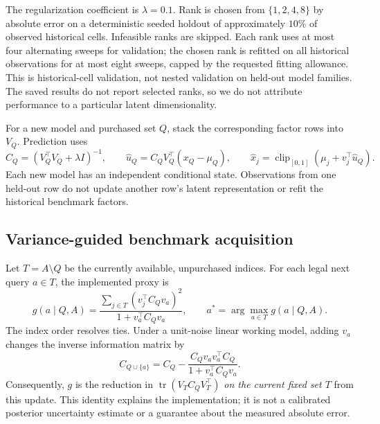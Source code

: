 \documentclass{article}
\begin{document}
The regularization coefficient is $\lambda=0.1$. Rank is chosen from $\{1,2,4,8\}$ by absolute error on a deterministic seeded holdout of approximately $10\%$ of observed historical cells. Infeasible ranks are skipped. Each rank uses at most four alternating sweeps for validation; the chosen rank is refitted on all historical observations for at most eight sweeps, capped by the requested fitting allowance. This is historical-cell validation, not nested validation on held-out model families. The saved results do not report selected ranks, so we do not attribute performance to a particular latent dimensionality.

For a new model and purchased set $Q$, stack the corresponding factor rows into $V_Q$. Prediction uses
\begin{equation}
 C_Q=(V_Q^\top V_Q+\lambda I)^{-1},\qquad
 \hat u_Q=C_QV_Q^\top(x_Q-\mu_Q),\qquad
 \hat x_j=\operatorname{clip}_{[0,1]}(\mu_j+v_j^\top\hat u_Q).
 \label{eq:predict}
\end{equation}
Each new model has an independent conditional state. Observations from one held-out row do not update another row's latent representation or refit the historical benchmark factors.

\subsection{Variance-guided benchmark acquisition}
Let $T=A\setminus Q$ be the currently available, unpurchased indices. For each legal next query $a\in T$, the implemented proxy is
\begin{equation}
 g(a\mid Q,A)=\frac{\sum_{j\in T}(v_j^\top C_Qv_a)^2}
                         {1+v_a^\top C_Qv_a},\qquad
 a^*=\arg\max_{a\in T}g(a\mid Q,A).
 \label{eq:acq}
\end{equation}
The index order resolves ties. Under a unit-noise linear working model, adding $v_a$ changes the inverse information matrix by
\begin{equation}
 C_{Q\cup\{a\}}=C_Q-
 \frac{C_Qv_av_a^\top C_Q}{1+v_a^\top C_Qv_a}.
 \label{eq:rankone}
\end{equation}
Consequently, $g$ is the reduction in $\operatorname{tr}(V_TC_QV_T^\top)$ \emph{on the current fixed set $T$} from this update. This identity explains the implementation; it is not a calibrated posterior uncertainty estimate or a guarantee about the measured absolute error.
\end{document}
